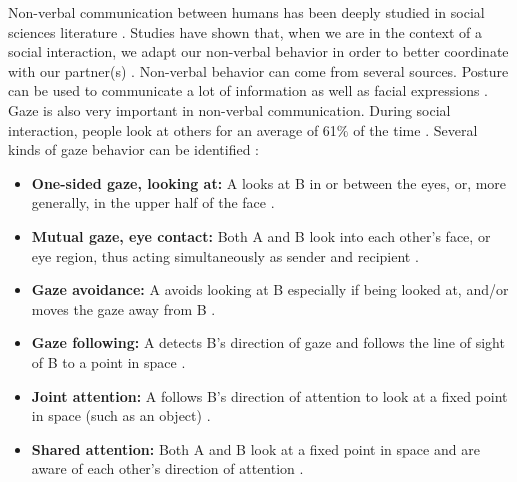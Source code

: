 \documentclass[english,a4paper,11pt,twoside]{StyleThese}
\begin{document}
Non-verbal communication between humans has been deeply studied in social sciences literature \cite{ekman1969repertoire, depaulo1992nonverbal}. Studies have shown that, when we are in the context of a social interaction, we adapt our non-verbal behavior in order to better coordinate with our partner(s) \cite{becchio2010toward, vesper2010minimal}. Non-verbal behavior can come from several sources. Posture can be used to communicate a lot of information \cite{mehrabian1969significance} as well as facial expressions \cite{labarre1947cultural}. Gaze is also very important in non-verbal communication. During social interaction, people look at others for an average of 61$\%$ of the time \cite{argyle1972gaze}. Several kinds of gaze behavior can be identified \cite{mutlu2009designing}:
\begin{itemize}
\item \textbf{One-sided gaze, looking at:} A looks at B
in or between the eyes, or, more generally, in the upper half of the face \cite{cook1977gaze}.
\item \textbf{Mutual gaze, eye contact:} Both A and B look into each other’s face, or eye region, thus acting simultaneously as sender and recipient \cite{von1973perception}.
\item \textbf{ Gaze avoidance:} A avoids looking at B especially
if being looked at, and/or moves the gaze away from B \cite{von1973perception, emery2000eyes}.
\item \textbf{Gaze following:} A detects B’s direction of gaze and follows the line of sight of B to a point in space \cite{emery2000eyes}.
\item \textbf{Joint attention:} A follows B’s direction of attention
to look at a fixed point in space (such as an object) \cite{butterworth1991ontogeny}.
\item \textbf{Shared attention:} Both A and B look at a fixed point in space and are aware of each other’s direction of attention \cite{baron1995eye, emery2000eyes}.
\end{itemize}
\end{document}
